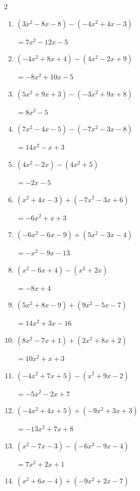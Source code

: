 \begin{multicols}{2}
\begin{enumerate}
  \item $(3x^{2}-8x-8)-(-4x^{2}+4x-3)$

        $=7x^{2}-12x-5$

  \item $(-4x^{2}+8x+4)-(4x^{2}-2x+9)$

        $=-8x^{2}+10x-5$

\columnbreak %

\resetques

  \item $(5x^{2}+9x+3)-(-3x^{2}+9x+8)$

        $=8x^{2}-5$

  \item $(7x^{2}-4x-5)-(-7x^{2}-3x-8)$

        $=14x^{2}-x+3$

  \item $(4x^{2}-2x)-(4x^{2}+5)$

        $=-2x-5$

  \item $(x^{2}+4x-3)+(-7x^{2}-3x+6)$

        $=-6x^{2}+x+3$

  \item $(-6x^{2}-6x-9)+(5x^{2}-3x-4)$

        $=-x^{2}-9x-13$

  \item $(x^{2}-6x+4)-(x^{2}+2x)$

        $=-8x+4$

  \item $(5x^{2}+8x-9)+(9x^{2}-5x-7)$

        $=14x^{2}+3x-16$

  \item $(8x^{2}-7x+1)+(2x^{2}+8x+2)$

        $=10x^{2}+x+3$

  \item $(-4x^{2}+7x+5)-(x^{2}+9x-2)$

        $=-5x^{2}-2x+7$

  \item $(-4x^{2}+4x+5)+(-9x^{2}+3x+3)$

        $=-13x^{2}+7x+8$

  \item $(x^{2}-7x-3)-(-6x^{2}-9x-4)$

        $=7x^{2}+2x+1$

  \item $(x^{2}+6x-4)+(-9x^{2}+2x-7)$


\end{enumerate}
\end{multicols}
